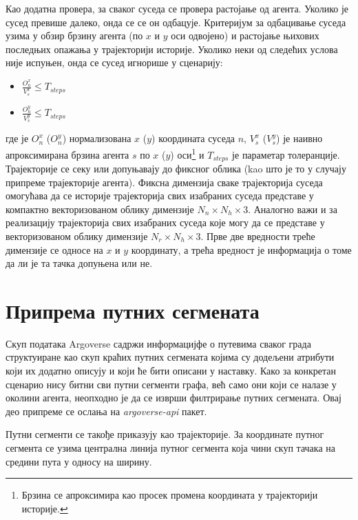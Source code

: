 \documentclass[11pt,oneside]{memoir}
\begin{document}
Као додатна провера, за сваког суседа се провера растојање од агента. Уколико је сусед превише далеко, онда се се он одбацује.
Критеријум за одбацивање суседа узима у обзир брзину агента (по $x$ и $y$ оси одвојено) и растојање њихових последњих опажања
у трајекторији историје. Уколико неки од следећих услова није
испуњен, онда се сусед игнорише у сценарију: 
\begin{itemize}
  \item $\frac{O_n^x}{V_s^x} \leq T_{steps}$
  \item $\frac{O_n^y}{V_s^y} \leq T_{steps}$
\end{itemize}
где је $O_n^x$ ($O_n^y$) нормализована $x$ ($y$) координата суседа $n$, $V_s^x$ ($V_s^y$) је наивно
апроксимирана брзина агента $s$
по $x$ ($y$) оси\footnote{Брзина се апроксимира као просек промена координата у трајекторији историје.} и $T_{steps}$ је параметар толеранције.
Трајекторије се секу или допуњавају до фиксног облика (kao што је то у случају припреме трајекторије агента). 
Фиксна димензија сваке трајекторија суседа омогућава да се историје трајекторија свих изабраних суседа представе у компактно векторизованом
облику димензије $N_n\times N_h\times 3$. Аналогно важи и за реализацију трајекторија свих изабраних суседа које могу да се представе у векторизованом
облику димензије $N_r\times N_h\times 3$. Прве две вредности треће димензије се односе на $x$ и $y$ координату, а 
трећа вредност је информација о томе да ли је та тачка допуњена или не.

\section{Припрема путних сегмената}

Скуп података Argoverse садржи информацијфе о путевима сваког града структуиране као скуп краћих путних сегмената
којима су додељени атрибути који их додатно описују и који ће бити описани у наставку. Како за конкретан сценарио нису битни сви путни сегменти
графа, већ само они који се налазе у околини агента, неопходно је да се изврши филтрирање путних сегмената. Овај део припреме се ослања на 
\textit{argoverse-api} пакет.

Путни сегменти се такође приказују као трајекторије. За координате путног сегмента се узима централна линија путног сегмента
која чини скуп тачака на средини пута у односу на ширину.
\end{document}
